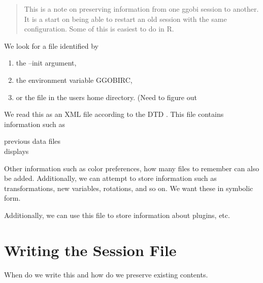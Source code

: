 \documentclass{article}
\begin{document}
\begin{abstract}
  This is a note on preserving information from one ggobi session to
  another.  It is a start on being able to restart an old session with
  the same configuration.  Some of this is easiest to do in R.
\end{abstract}

We look for a file identified by 
\begin{enumerate}
\item the --init argument,
\item the environment variable GGOBIRC,
\item or the  file 
in the users home directory. (Need to figure out
\end{enumerate}
We read this as an XML file according to the DTD .
This file contains
information such as
\begin{description}
\item[previous data files]
\item[displays]
\end{description}

Other information such as color preferences, how many files to
remember can also be added.  Additionally, we can attempt to store
information such as transformations, new variables, rotations, and so
on.  We want these in symbolic form.

Additionally, we can use this file to store information about plugins,
etc.


\section{Writing the Session File}

When do we write this and how do we preserve
existing contents.
\end{document}
